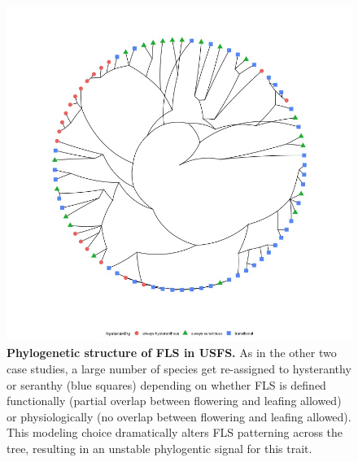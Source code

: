 \documentclass[12pt]{article}\usepackage[]{graphicx}\usepackage[]{color}
\begin{document}
     \begin{figure}
    \centering
    \includegraphics[width=.8\textwidth]{..//figure/silvtreeplot.jpeg}
    \caption{\textbf{Phylogenetic structure of FLS in USFS.} As in the other two case studies, a large number of species get re-assigned to hysteranthy or seranthy (blue squares) depending on whether FLS is defined functionally (partial overlap between flowering and leafing allowed) or physiologically (no overlap between flowering and leafing allowed). This modeling choice dramatically alters FLS patterning across the tree, resulting in an unstable phylogentic signal for this trait.}
    \label{fig:Figure S2}
    \end{figure}
    
\end{document}

